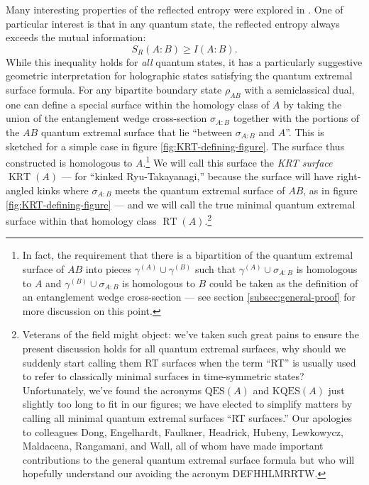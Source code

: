 \documentclass[a4paper,11pt]{article}
\newcommand{\RT}{\operatorname{RT}}
\newcommand{\KRT}{\operatorname{KRT}}
\begin{document}
Many interesting properties of the reflected entropy were explored in \cite{dutta-faulkner}. One of particular interest is that in any quantum state, the reflected entropy always exceeds the mutual information:
\begin{equation}
    S_R(A:B) \geq I(A:B).
\end{equation}
While this inequality holds for \emph{all} quantum states, it has a particularly suggestive geometric interpretation for holographic states satisfying the quantum extremal surface formula. For any bipartite boundary state $\rho_{AB}$ with a semiclassical dual, one can define a special surface within the homology class of $A$ by taking the union of the entanglement wedge cross-section $\sigma_{A:B}$ together with the portions of the $AB$ quantum extremal surface that lie ``between $\sigma_{A:B}$ and $A$''. This is sketched for a simple case in figure \ref{fig:KRT-defining-figure}. The surface thus constructed is homologous to $A$.\footnote{In fact, the requirement that there is a bipartition of the quantum extremal surface of $AB$ into pieces $\gamma^{(A)} \cup \gamma^{(B)}$ such that $\gamma^{(A)} \cup \sigma_{A:B}$ is homologous to $A$ and $\gamma^{(B)} \cup \sigma_{A:B}$ is homologous to $B$ could be taken as the definition of an entanglement wedge cross-section --- see section \ref{subsec:general-proof} for more discussion on this point.} We will call this surface the \emph{KRT surface} $\KRT(A)$ --- for ``kinked Ryu-Takayanagi,'' because the surface will have right-angled kinks where $\sigma_{A:B}$ meets the quantum extremal surface of $AB$, as in figure \ref{fig:KRT-defining-figure} --- and we will call the true minimal quantum extremal surface within that homology class $\RT(A)$.\footnote{Veterans of the field might object: we've taken such great pains to ensure the present discussion holds for all quantum extremal surfaces, why should we suddenly start calling them RT surfaces when the term ``RT'' is usually used to refer to classically minimal surfaces in time-symmetric states? Unfortunately, we've found the acronyms $\mathrm{QES}(A)$ and $\mathrm{KQES}(A)$ just slightly too long to fit in our figures; we have elected to simplify matters by calling all minimal quantum extremal surfaces ``RT surfaces.'' Our apologies to colleagues Dong, Engelhardt, Faulkner, Headrick, Hubeny, Lewkowycz, Maldacena, Rangamani, and Wall, all of whom have made important contributions to the general quantum extremal surface formula but who will hopefully understand our avoiding the acronym DEFHHLMRRTW.}
\end{document}

